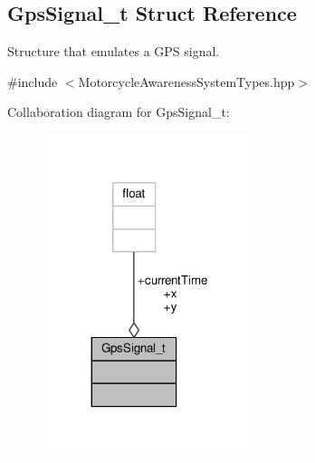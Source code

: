 \hypertarget{structGpsSignal__t}{\subsection{Gps\-Signal\-\_\-t Struct Reference}
\label{structGpsSignal__t}
}


Structure that emulates a G\-P\-S signal.  




{\ttfamily \#include $<$Motorcycle\-Awareness\-System\-Types.\-hpp$>$}



Collaboration diagram for Gps\-Signal\-\_\-t\-:\nopagebreak
\begin{figure}[H]
\begin{center}
\leavevmode
\includegraphics[width=176pt]{structGpsSignal__t__coll__graph}
\end{center}
\end{figure}
